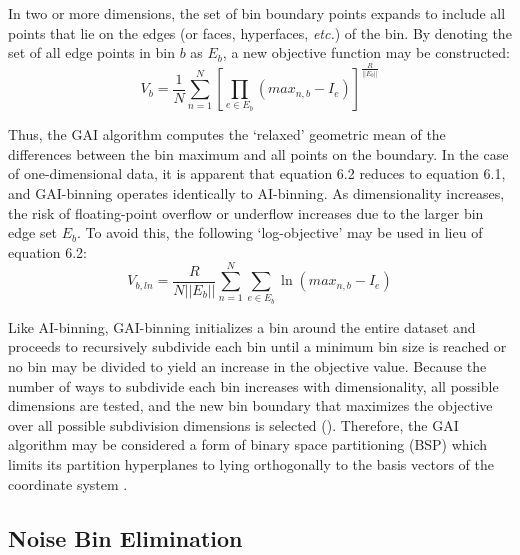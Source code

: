 \begin{doublespace}
In two or more dimensions, the set of bin boundary points expands to include
all points that lie on the edges (or faces, hyperfaces, {\it etc.}) of the bin.
By denoting the set of all edge points in bin $b$ as $E_b$, a new objective
function may be constructed:
\begin{equation}
V_b = \frac{1}{N}
  \sum_{n=1}^N \left[
    \prod_{e \in E_b} (max_{n,b} - I_e)
  \right]^\frac{R}{||E_b||}
\end{equation}

Thus, the GAI algorithm computes the `relaxed' geometric mean of the
differences between the bin maximum and all points on the boundary. In the
case of one-dimensional data, it is apparent that equation 6.2 reduces to
equation 6.1, and GAI-binning operates identically to AI-binning. As
dimensionality increases, the risk of floating-point overflow or underflow
increases due to the larger bin edge set $E_b$. To avoid this, the following
`log-objective' may be used in lieu of equation 6.2:
\begin{equation}
V_{b,ln} = \frac{R}{N ||E_b||}
  \sum_{n=1}^N \sum_{e \in E_b}
    \ln(max_{n,b} - I_e)
\end{equation}

Like AI-binning, GAI-binning initializes a bin around the entire dataset and
proceeds to recursively subdivide each bin until a minimum bin size is reached
or no bin may be divided to yield an increase in the objective value. Because
the number of ways to subdivide each bin increases with dimensionality, all
possible dimensions are tested, and the new bin boundary that maximizes the
objective over all possible subdivision dimensions is selected
(). Therefore, the GAI algorithm may be considered
a form of binary space partitioning (BSP) which limits its partition
hyperplanes to lying orthogonally to the basis vectors of the coordinate
system \cite{deberg2000}.
\end{doublespace}

\subsection{Noise Bin Elimination}

